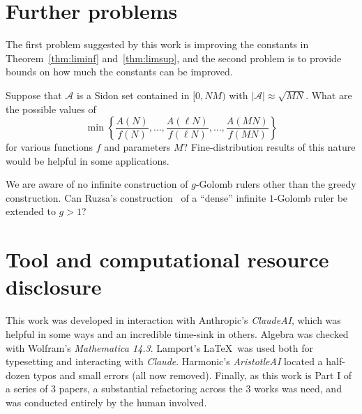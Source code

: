 \documentclass[10pt]{article}
\newcommand{\cA}{\mathcal{A}}
\begin{document}
\section{Further problems}\label{sec:problems}

The first problem suggested by this work is improving the constants in Theorem~\ref{thm:liminf} and~\ref{thm:limsup}, and the second problem is to provide bounds on how much the constants can be improved.

Suppose that $\cA$ is a Sidon set contained in $[0,NM)$ with $|\cA|\approx \sqrt{MN}$. What are the possible values of
  \[ \min \left\{\frac{A(N)}{f(N)}, \ldots, \frac{A(\ell N)}{f(\ell N)},\dots, \frac{A(MN)}{f(MN)}\right\}\]
for various functions $f$ and parameters $M$? Fine-distribution results of this nature would be helpful in some applications.

We are aware of no infinite construction of $g$-Golomb rulers other than the greedy construction. Can Ruzsa's construction~\cite{1998.Ruzsa-a} of a ``dense'' infinite $1$-Golomb ruler be extended to $g>1$?

\section*{Tool and computational resource disclosure}
This work was developed in interaction with Anthropic's \emph{ClaudeAI}, which was helpful in some ways and an incredible time-sink in others. Algebra was checked with Wolfram's \emph{Mathematica 14.3}. Lamport's \LaTeX\ was used both for typesetting and interacting with \emph{Claude}. Harmonic's \emph{AristotleAI} located a half-dozen typos and small errors (all now removed). Finally, as this work is Part I of a series of 3 papers, a substantial refactoring across the 3 works was need, and was conducted entirely by the human involved.
\end{document}
